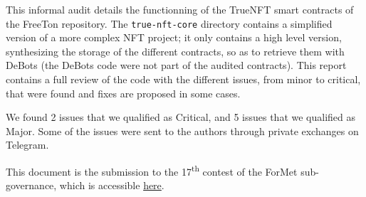 This informal audit details the functionning of the TrueNFT smart
contracts of the FreeTon repository.
%
The {\tt true-nft-core} directory contains a simplified version of a
more complex NFT project; it only contains a high level version,
synthesizing the storage of the different contracts, so as to retrieve
them with DeBots (the DeBots code were not part of the audited
contracts).
%
This report contains a full review of the code with the different issues, from 
minor to critical, that were found and fixes are proposed in some cases.

We found 2 issues that we qualified as Critical, and 5 issues that we
qualified as Major. Some of the issues were sent to the authors
through private exchanges on Telegram.

This document is the submission to the 17\textsuperscript{th} contest
of the ForMet sub-governance, which is accessible
\href{https://formet.gov.freeton.org/proposal?proposalAddress=0\%3Afad8efb6b82a8b321d8b4ce424c8e3362d2de5f96e1df9d702f18bb2d34c6b6f}{here}.
%
